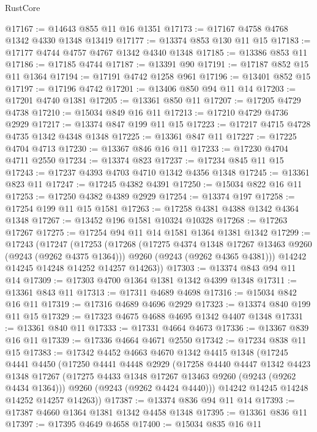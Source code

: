 \begin{lexlean}{RustCore}
\begin{coremodule}
@17167 := @14643 @855 @11 @16 @1351
@17173 := @17167 @4758 @4768 @1342 @4330 @1348 @13419
@17177 := @13374 @853 @130 @11 @15
@17183 := @17177 @4744 @4757 @4767 @1342 @4340 @1348
@17185 := @13386 @853 @11
@17186 := @17185 @4744
@17187 := @13391 @90
@17191 := @17187 @852 @15 @11 @1364
@17194 := @17191 @4742 @1258 @961
@17196 := @13401 @852 @15
@17197 := @17196 @4742
@17201 := @13406 @850 @94 @11 @14
@17203 := @17201 @4740 @1381
@17205 := @13361 @850 @11
@17207 := @17205 @4729 @4738
@17210 := @15034 @849 @16 @11
@17213 := @17210 @4729 @4736 @2929
@17217 := @13374 @847 @199 @11 @15
@17223 := @17217 @4715 @4728 @4735 @1342 @4348 @1348
@17225 := @13361 @847 @11
@17227 := @17225 @4704 @4713
@17230 := @13367 @846 @16 @11
@17233 := @17230 @4704 @4711 @2550
@17234 := @13374 @823
@17237 := @17234 @845 @11 @15
@17243 := @17237 @4393 @4703 @4710 @1342 @4356 @1348
@17245 := @13361 @823 @11
@17247 := @17245 @4382 @4391
@17250 := @15034 @822 @16 @11
@17253 := @17250 @4382 @4389 @2929
@17254 := @13374 @197
@17258 := @17254 @199 @11 @15 @1581
@17263 := @17258 @4381 @4388 @1342 @4364 @1348
@17267 := @13452 @196 @1581 @10324 @10328
@17268 := @17263 @17267
@17275 := @17254 @94 @11 @14 @1581 @1364 @1381 @1342
@17299 := @17243
    (@17247
      (@17253
        (@17268
          (@17275 @4374 @1348 @17267 @13463 @9260 (@9243 (@9262 @4375 @1364)))
          @9260
          (@9243 (@9262 @4365 @4381)))
        @14242
        @14245
        @14248
        @14252
        @14257
        @14263))
@17303 := @13374 @843 @94 @11 @14
@17309 := @17303 @4700 @1364 @1381 @1342 @4399 @1348
@17311 := @13361 @843 @11
@17313 := @17311 @4689 @4698
@17316 := @15034 @842 @16 @11
@17319 := @17316 @4689 @4696 @2929
@17323 := @13374 @840 @199 @11 @15
@17329 := @17323 @4675 @4688 @4695 @1342 @4407 @1348
@17331 := @13361 @840 @11
@17333 := @17331 @4664 @4673
@17336 := @13367 @839 @16 @11
@17339 := @17336 @4664 @4671 @2550
@17342 := @17234 @838 @11 @15
@17383 := @17342
    @4452
    @4663
    @4670
    @1342
    @4415
    @1348
    (@17245
      @4441
      @4450
      (@17250
        @4441
        @4448
        @2929
        (@17258
          @4440
          @4447
          @1342
          @4423
          @1348
          @17267
          (@17275 @4433 @1348 @17267 @13463 @9260 (@9243 (@9262 @4434 @1364)))
          @9260
          (@9243 (@9262 @4424 @4440)))
        @14242
        @14245
        @14248
        @14252
        @14257
        @14263))
@17387 := @13374 @836 @94 @11 @14
@17393 := @17387 @4660 @1364 @1381 @1342 @4458 @1348
@17395 := @13361 @836 @11
@17397 := @17395 @4649 @4658
@17400 := @15034 @835 @16 @11

\end{coremodule}
\end{lexlean}

